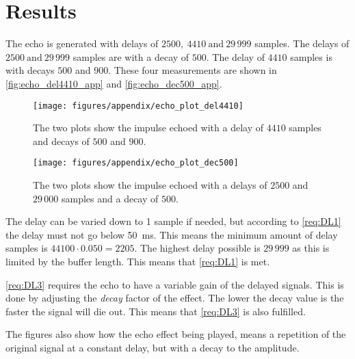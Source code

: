 \section{Results}
The echo is generated with delays of $2500, ~4410 ~\text{and} ~29\,999$ samples. The delays of $2500 ~\text{and} ~29\,999$ samples are with a decay of $500$. The delay of $4410$ samples is with decays $500$ and $900$. These four measurements are shown in \autoref{fig:echo_del4410_app} and \autoref{fig:echo_dec500_app}.

\begin{figure}[htbp]
	\centering
	\texttt{[image: figures/appendix/echo\_plot\_del4410]}
	\caption{The two plots show the impulse echoed with a delay of $ 4410 $ samples and decays of $ 500 $ and $ 900 $.}
	\label{fig:echo_del4410_app}
\end{figure}

\begin{figure}[htbp]
	\centering
	\texttt{[image: figures/appendix/echo\_plot\_dec500]}
	\caption{The two plots show the impulse echoed with a delays of $ 2500 $ and $ 29\,000 $ samples and a decay of $ 500 $.}
	\label{fig:echo_dec500_app}
\end{figure}

The delay can be varied down to 1 sample if needed, but according to \autoref{req:DL1} the delay must not go below \SI{50}{\milli\second}. This means the minimum amount of delay samples is $44100\cdot0.050=2205$. The highest delay possible is $29\,999$ as this is limited by the buffer length. This means that \autoref{req:DL1} is met.

\autoref{req:DL3} requires the echo to have a variable gain of the delayed signals. This is done by adjusting the \textit{decay} factor of the effect. The lower the decay value is the faster the signal will die out. This means that \autoref{req:DL3} is also fulfilled.

The figures also show how the echo effect being played, means a repetition of the original signal at a constant delay, but with a decay to the amplitude.